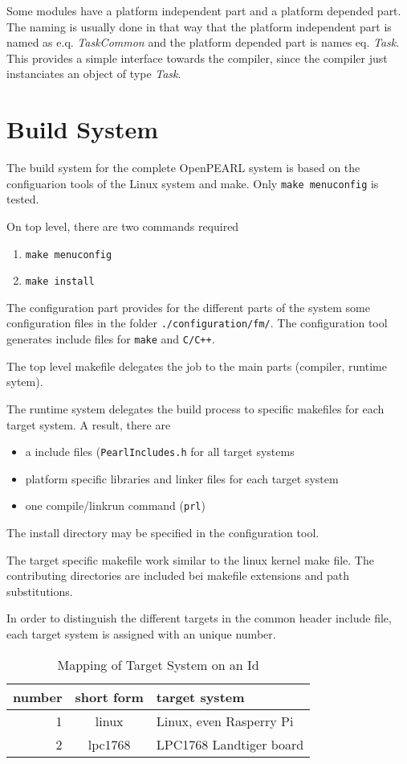 Some modules have a platform independent part and a platform
depended part. The naming is usually done in that way that the 
platform independent part is named as e.q. {\em TaskCommon} and the 
platform depended part is names eq. {\em Task}. This provides a simple
interface towards the compiler, since the compiler just instanciates
an object of type {\em Task}.

\section{Build System}
\label{sec:buildsystem}
The build system for the complete OpenPEARL system is based on the 
configuarion tools of the Linux system and make.
Only \texttt{make menuconfig} is tested.

On top level, there are two commands required
\begin{enumerate}
\item \texttt{make menuconfig}
\item \texttt{make install}
\end{enumerate}

The configuration part provides for the different parts of the system
some configuration files in the folder \texttt{./configuration/fm/}.
The configuration tool generates include files for \texttt{make} and
\texttt{C/C++}.

The top level makefile delegates the job to the main parts
 (compiler, runtime sytem).

The runtime system delegates the build process to specific makefiles 
for each target system. A result, there are
\begin{itemize}
\item a include files (\texttt{PearlIncludes.h} for all target systems
\item platform specific libraries and linker files for each target system
\item one compile/linkrun command (\texttt{prl})
\end{itemize}
The install directory may be specified in the configuration tool.

The target specific makefile work similar to the linux kernel make file.
The contributing directories are included bei makefile extensions and
path substitutions.

In order to distinguish the different targets in the common header include
file, each target system is assigned with an unique number.

\begin{table}[bpht]
\begin{tabular}{|r|c|l|}
\hline
number & short form & target system \\
\hline
1 & linux &  Linux, even Rasperry Pi\\
2 & lpc1768 & LPC1768 Landtiger board \\
\hline
\end{tabular}
\caption{Mapping of Target System on an  Id}
\label{tab:targetId}
\end{table}

